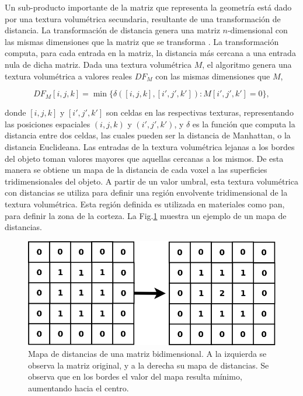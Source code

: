 Un sub-producto importante de la matriz que representa la geometría está dado por una textura volumétrica secundaria, resultante de una transformación de distancia.
La transformación de distancia genera una matriz $n$-dimensional con las mismas dimensiones que la matriz que se transforma \cite{osh03}.
La transformación computa, para cada entrada en la matriz, la distancia más cercana a una entrada nula de dicha matriz.
Dada una textura volumétrica $M$, el algoritmo genera una textura volumétrica a valores reales $DF_{M}$ con las mismas dimensiones que $M$,


$$DF_{M}[i,j,k] = \min \bigg\{ \delta([i,j,k],[i',j',k']): M[i',j',k'] = 0 \bigg\},$$


\noindent donde $[i,j,k]$ y $[i',j',k']$ son celdas en las respectivas texturas, representando las posiciones espaciales $(i,j,k)$ y $(i',j',k')$, y $\delta$ es la función que computa la distancia entre dos celdas, las cuales pueden ser la distancia de Manhattan, o la distancia Euclideana.
Las entradas de la textura volumétrica lejanas a los bordes del objeto toman valores mayores que aquellas cercanas a los mismos.
De esta manera se obtiene un mapa de la distancia de cada voxel a las superficies tridimensionales del objeto.
A partir de un valor umbral, esta textura volumétrica con distancias se utiliza para definir una región envolvente tridimensional de la textura volumétrica.
Esta región definida es utilizada en materiales como pan, para definir la zona de la corteza.
La Fig.\ref{fg:distance} muestra un ejemplo de un mapa de distancias.

\begin{figure}
\includegraphics[width=12cm]{figures/distance}
\caption[Mapa de distancias de una matriz bidimensional]{Mapa de distancias de una matriz bidimensional. A la izquierda se observa la matriz original, y a la derecha su mapa de distancias. Se observa que en los bordes el valor del mapa resulta mínimo, aumentando hacia el centro.}
\label{fg:distance}
\end{figure}

